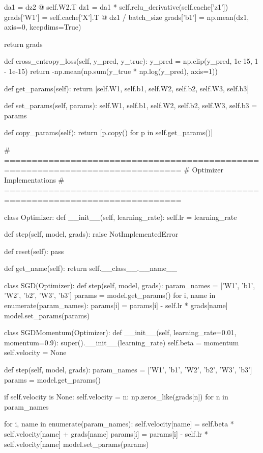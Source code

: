 \documentclass[../../main.tex]{subfiles}
\begin{document}
\begin{pythoncode}
        da1 = dz2 @ self.W2.T
        dz1 = da1 * self.relu_derivative(self.cache['z1'])
        grads['W1'] = self.cache['X'].T @ dz1 / batch_size
        grads['b1'] = np.mean(dz1, axis=0, keepdims=True)

        return grads

    def cross_entropy_loss(self, y_pred, y_true):
        y_pred = np.clip(y_pred, 1e-15, 1 - 1e-15)
        return -np.mean(np.sum(y_true * np.log(y_pred), axis=1))

    def get_params(self):
        return [self.W1, self.b1, self.W2, self.b2, self.W3, self.b3]

    def set_params(self, params):
        self.W1, self.b1, self.W2, self.b2, self.W3, self.b3 = params

    def copy_params(self):
        return [p.copy() for p in self.get_params()]


# ==============================================================================
# Optimizer Implementations
# ==============================================================================

class Optimizer:
    def __init__(self, learning_rate):
        self.lr = learning_rate

    def step(self, model, grads):
        raise NotImplementedError

    def reset(self):
        pass

    def get_name(self):
        return self.__class__.__name__


class SGD(Optimizer):
    def step(self, model, grads):
        param_names = ['W1', 'b1', 'W2', 'b2', 'W3', 'b3']
        params = model.get_params()
        for i, name in enumerate(param_names):
            params[i] = params[i] - self.lr * grads[name]
        model.set_params(params)


class SGDMomentum(Optimizer):
    def __init__(self, learning_rate=0.01, momentum=0.9):
        super().__init__(learning_rate)
        self.beta = momentum
        self.velocity = None

    def step(self, model, grads):
        param_names = ['W1', 'b1', 'W2', 'b2', 'W3', 'b3']
        params = model.get_params()

        if self.velocity is None:
            self.velocity = {n: np.zeros_like(grads[n]) for n in param_names}

        for i, name in enumerate(param_names):
            self.velocity[name] = self.beta * self.velocity[name] + grads[name]
            params[i] = params[i] - self.lr * self.velocity[name]
        model.set_params(params)


\end{pythoncode}
\end{document}
